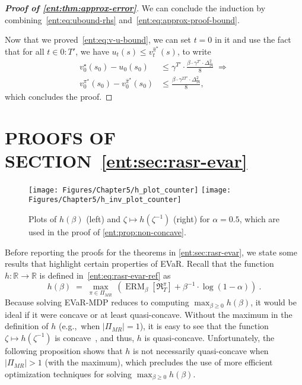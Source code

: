 \documentclass[twoside]{article}
\newcommand{\opt}{^\star}
\newcommand{\vspan}{\Delta_{\mathfrak{R}}}
\newcommand{\erm}[2]{\operatorname{ERM}_{#1}\left[#2\right]}
\newcommand{\Real}{\mathbb{R}}
\theoremstyle{plain}
\theoremstyle{definition}
\theoremstyle{remark}
\renewcommand{\cite}[1]{\citep{#1}}
\begin{document}
\begin{proof}[\bf\em Proof of \cref{ent:thm:approx-error}]
We can conclude the induction by combining~\eqref{ent:eq:ubound-rhs} and~\eqref{ent:eq:approx-proof-bound}. 

Now that we proved~\eqref{ent:eq:v-u-bound}, we can set $t=0$ in it and use the fact that for all $t\in 0{:}T'$, we have $ u_t(s) \leq v^{\hat{\pi}\opt}_t(s)$, to write 
%
\begin{align*}
    v_0\opt(s_0) - u_0(s_0) &\leq \gamma^{T'} \cdot \frac{\beta \cdot \gamma^{T'} \cdot \vspan^2}{8} \; \Longrightarrow \\
    v_0^{\pi\opt}(s_0) - v^{\hat{\pi}\opt}_0(s_0) &\leq \frac{\beta \cdot \gamma^{2T'} \cdot \vspan^2}{8}, 
\end{align*}
%
which concludes the proof. 
\end{proof}


\newpage

\section{PROOFS OF SECTION~\ref{ent:sec:rasr-evar}}
\label{ent:app:sec:EVaR}

\begin{figure} \label{ent:fig:h-counter-proof}
  \centering
 \texttt{[image: Figures/Chapter5/h\_plot\_counter]}
 \hspace{0.08\textwidth}
 \texttt{[image: Figures/Chapter5/h\_inv\_plot\_counter]}
  \caption{Plots of $h(\beta)$ (left) and $\zeta \mapsto h(\zeta^{-1})$ (right) for $\alpha=0.5$, which are used in the proof of \cref{ent:prop:non-concave}.}
\end{figure}

Before reporting the proofs for the theorems in \cref{ent:sec:rasr-evar}, we state some results that highlight certain properties of EVaR. Recall that the function $h\colon \Real \to \Real$ is defined in~\eqref{ent:eq:rasr-evar-ref} as
\[
 h(\beta) \;=\; \max_{\pi\in\Pi_{MR}}\, \left(\erm{\beta}{\mathfrak{R}_{T}^\pi} + \beta^{-1} \cdot \log(1-\alpha) \right) ~.
\]
Because solving EVaR-MDP reduces to computing $\max_{\beta \ge 0} h(\beta)$, it would be ideal if it were concave or at least quasi-concave. Without the maximum in the definition of $h$ (e.g.,~when $|\Pi_{MR}| = 1$), it is easy to see that the function $\zeta \mapsto h(\zeta^{-1})$ is concave~\cite{Ahmadi-Javid2012}, and thus, $h$ is quasi-concave. Unfortunately, the following proposition shows that $h$ is not necessarily quasi-concave when $|\Pi_{MR}| > 1$ (with the maximum), which precludes the use of more efficient optimization techniques for solving $\max_{\beta \ge 0} h(\beta)$.
\end{document}
